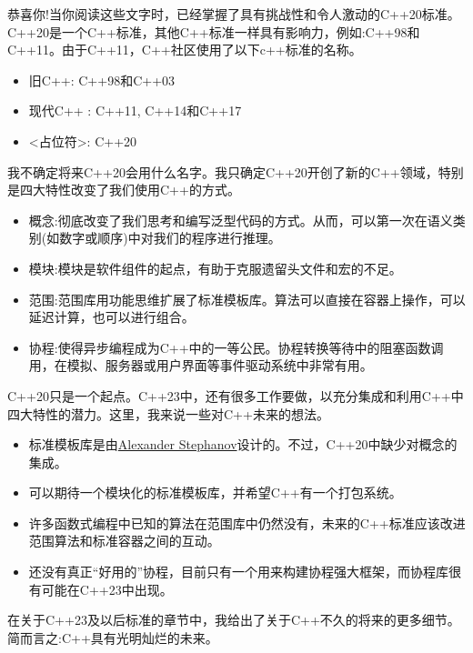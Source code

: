 恭喜你!当你阅读这些文字时，已经掌握了具有挑战性和令人激动的C++20标准。C++20是一个C++标准，其他C++标准一样具有影响力，例如:C++98和C++11。由于C++11，C++社区使用了以下c++标准的名称。

\begin{itemize}
\item 
旧C++: C++98和C++03

\item 
现代C++ : C++11, C++14和C++17

\item 
<占位符>: C++20
\end{itemize}
	
我不确定将来C++20会用什么名字。我只确定C++20开创了新的C++领域，特别是四大特性改变了我们使用C++的方式。

\begin{itemize}
\item 
概念:彻底改变了我们思考和编写泛型代码的方式。从而，可以第一次在语义类别(如数字或顺序)中对我们的程序进行推理。

\item 
模块:模块是软件组件的起点，有助于克服遗留头文件和宏的不足。

\item 
范围:范围库用功能思维扩展了标准模板库。算法可以直接在容器上操作，可以延迟计算，也可以进行组合。

\item 
协程:使得异步编程成为C++中的一等公民。协程转换等待中的阻塞函数调用，在模拟、服务器或用户界面等事件驱动系统中非常有用。
\end{itemize}

C++20只是一个起点。C++23中，还有很多工作要做，以充分集成和利用C++中四大特性的潜力。这里，我来说一些对C++未来的想法。

\begin{itemize}
\item 
标准模板库是由\href{https://en.wikipedia.org/wiki/Alexander_Stepanov}{Alexander Stephanov}设计的。不过，C++20中缺少对概念的集成。

\item 
可以期待一个模块化的标准模板库，并希望C++有一个打包系统。

\item 
许多函数式编程中已知的算法在范围库中仍然没有，未来的C++标准应该改进范围算法和标准容器之间的互动。

\item 
还没有真正“好用的”协程，目前只有一个用来构建协程强大框架，而协程库很有可能在C++23中出现。
\end{itemize}

在关于C++23及以后标准的章节中，我给出了关于C++不久的将来的更多细节。简而言之:C++具有光明灿烂的未来。






